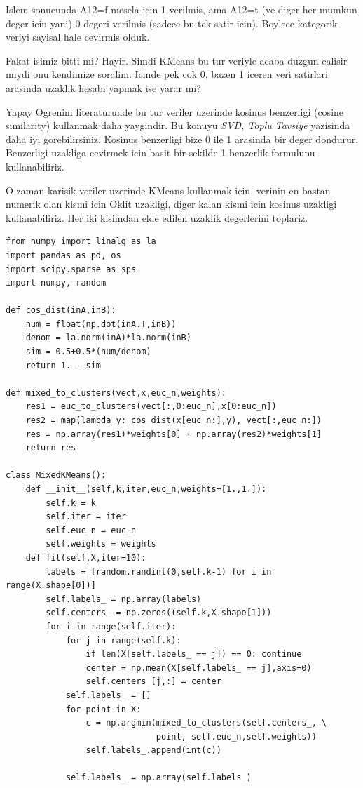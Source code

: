 \documentclass[12pt,fleqn]{article}\usepackage{../common}
\begin{document}
Islem sonucunda A12=f mesela icin 1 verilmis, ama A12=t (ve diger her
mumkun deger icin yani) 0 degeri verilmis (sadece bu tek satir
icin). Boylece kategorik veriyi sayisal hale cevirmis olduk.

Fakat isimiz bitti mi? Hayir. Simdi KMeans bu tur veriyle acaba duzgun
calisir miydi onu kendimize soralim. Icinde pek cok 0, bazen 1 iceren 
veri satirlari arasinda uzaklik hesabi yapmak ise yarar mi?

Yapay Ogrenim literaturunde bu tur veriler uzerinde kosinus benzerligi
(cosine similarity) kullanmak daha yaygindir. Bu konuyu {\em SVD, Toplu
Tavsiye} yazisinda daha iyi gorebilirsiniz. Kosinus benzerligi bize
0 ile 1 arasinda bir deger dondurur. Benzerligi uzakliga cevirmek icin
basit bir sekilde 1-benzerlik formulunu kullanabiliriz.

O zaman karisik veriler uzerinde KMeans kullanmak icin, verinin en
bastan numerik olan kismi icin Oklit uzakligi, diger kalan kismi icin
kosinus uzakligi kullanabiliriz. Her iki kisimdan elde edilen uzaklik
degerlerini toplariz.

\begin{verbatim}
from numpy import linalg as la
import pandas as pd, os
import scipy.sparse as sps
import numpy, random

def cos_dist(inA,inB):
    num = float(np.dot(inA.T,inB))
    denom = la.norm(inA)*la.norm(inB)
    sim = 0.5+0.5*(num/denom)
    return 1. - sim

def mixed_to_clusters(vect,x,euc_n,weights):
    res1 = euc_to_clusters(vect[:,0:euc_n],x[0:euc_n])
    res2 = map(lambda y: cos_dist(x[euc_n:],y), vect[:,euc_n:])
    res = np.array(res1)*weights[0] + np.array(res2)*weights[1]
    return res

class MixedKMeans():
    def __init__(self,k,iter,euc_n,weights=[1.,1.]):
        self.k = k
        self.iter = iter
        self.euc_n = euc_n
        self.weights = weights
    def fit(self,X,iter=10):
        labels = [random.randint(0,self.k-1) for i in range(X.shape[0])]
        self.labels_ = np.array(labels)
        self.centers_ = np.zeros((self.k,X.shape[1]))
        for i in range(self.iter):
            for j in range(self.k):
                if len(X[self.labels_ == j]) == 0: continue
                center = np.mean(X[self.labels_ == j],axis=0)
                self.centers_[j,:] = center
            self.labels_ = []
            for point in X:
                c = np.argmin(mixed_to_clusters(self.centers_, \
                              point, self.euc_n,self.weights))
                self.labels_.append(int(c))

            self.labels_ = np.array(self.labels_)
\end{verbatim}
\end{document}

